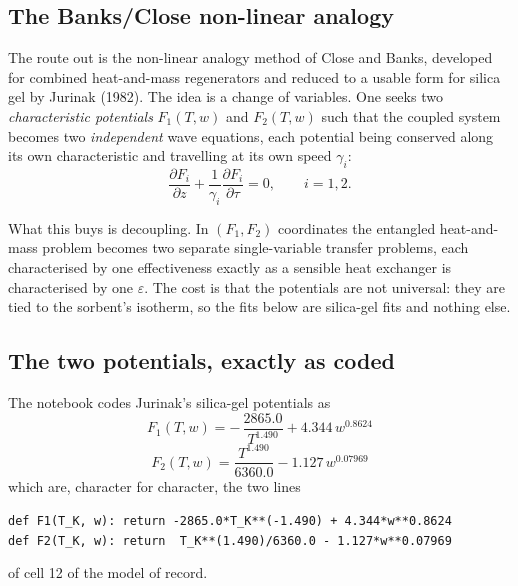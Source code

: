 \subsection{The Banks/Close non-linear analogy}
\label{sec:dw:analogy}

The route out is the non-linear analogy method of Close and Banks, developed
for combined heat-and-mass regenerators and reduced to a usable form for
silica gel by Jurinak (1982). The idea is a change of variables. One seeks
two \emph{characteristic potentials} $F_1(T,w)$ and $F_2(T,w)$ such that the
coupled system becomes two \emph{independent} wave equations, each potential
being conserved along its own characteristic and travelling at its own speed
$\gamma_i$:
\begin{equation}
\frac{\partial F_i}{\partial z}
+\frac{1}{\gamma_i}\frac{\partial F_i}{\partial \tau}=0,
\qquad i=1,2 .
\label{eq:dw:waves}
\end{equation}

What this buys is decoupling. In $(F_1,F_2)$ coordinates the entangled
heat-and-mass problem becomes two separate single-variable transfer problems,
each characterised by one effectiveness exactly as a sensible heat exchanger
is characterised by one $\varepsilon$. The cost is that the potentials are not
universal: they are tied to the sorbent's isotherm, so the fits below are
silica-gel fits and nothing else.

\subsection{The two potentials, exactly as coded}
\label{sec:dw:potentials}

The notebook codes Jurinak's silica-gel potentials as
\begin{equation}
\boxed{\;
F_1(T,w) = -\,\frac{2865.0}{T^{1.490}} + 4.344\,w^{0.8624}
\;}
\label{eq:dw:F1}
\end{equation}
\begin{equation}
\boxed{\;
F_2(T,w) = \frac{T^{1.490}}{6360.0} - 1.127\,w^{0.07969}
\;}
\label{eq:dw:F2}
\end{equation}
which are, character for character, the two lines
\begin{center}
\texttt{def F1(T\_K, w): return -2865.0*T\_K**(-1.490) + 4.344*w**0.8624}\\
\texttt{def F2(T\_K, w): return\ \ T\_K**(1.490)/6360.0 - 1.127*w**0.07969}
\end{center}
of cell 12 of the model of record.

